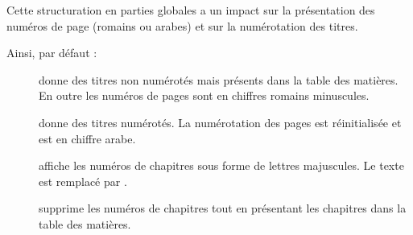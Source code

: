 Cette structuration en parties globales a un impact sur la présentation des numéros de page (romains ou arabes) et sur la numérotation des titres.

Ainsi, par défaut : \begin{description}
\item[] donne des titres non numérotés mais présents dans la table des matières. En outre les numéros de pages sont en chiffres romains minuscules. 
\item[] donne des titres numérotés. La numérotation des pages est réinitialisée et est en chiffre arabe.
\item[] affiche les numéros de chapitres sous forme de lettres majuscules. Le texte  est remplacé par .
\item[] supprime les numéros de chapitres tout en présentant les chapitres dans la table des matières.
\end{description}

